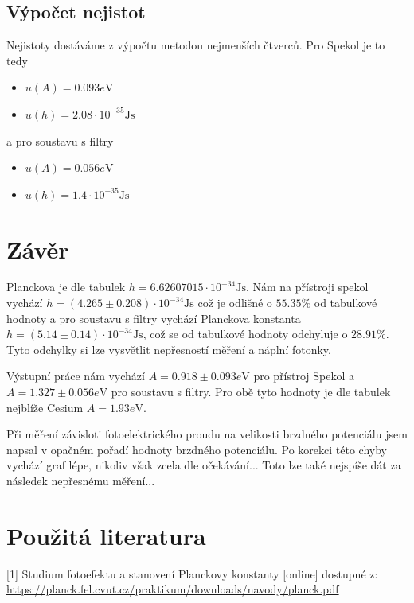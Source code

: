 \documentclass[titlepage]{article}
\begin{document}
\subsection{Výpočet nejistot}
Nejistoty dostáváme z výpočtu metodou nejmenších čtverců.
Pro Spekol je to tedy
\begin{itemize}
 \item $u(A) = 0.093 \si{e\volt}$
 \item $u(h) = 2.08 \cdot 10^{-35} \si{\joule\second}$
\end{itemize}
a pro soustavu s filtry
\begin{itemize}
 \item $u(A) = 0.056 \si{e\volt}$
 \item $u(h) = 1.4 \cdot 10^{-35} \si{\joule\second}$
\end{itemize}

\section{Závěr}

Planckova je dle tabulek $h=6.62607015 \cdot 10^{-34} \si{\joule\second}$. Nám na přístroji spekol vychází $h=(4.265\pm0.208) \cdot 10^{-34} \si{\joule\second}$ což je odlišné o $55.35\%$ od tabulkové hodnoty a pro soustavu s filtry vychází Planckova konstanta $h = (5.14\pm0.14)\cdot10^{-34}\si{\joule\second}$, což se od tabulkové hodnoty odchyluje o $28.91\%$. Tyto odchylky si lze vysvětlit nepřesností měření a náplní fotonky.

Výstupní práce nám vychází $A = 0.918\pm0.093 \si{e\volt}$ pro přístroj Spekol a $A = 1.327 \pm 0.056 \si{e\volt}$ pro soustavu s filtry. Pro obě tyto hodnoty je dle tabulek nejblíže Cesium $A = 1.93 \si{e\volt}$.

Při měření závisloti fotoelektrického proudu na velikosti brzdného potenciálu jsem napsal v opačném pořadí hodnoty brzdného potenciálu. Po korekci této chyby vychází graf lépe, nikoliv však zcela dle očekávání... Toto lze také nejspíše dát za následek nepřesnému měření...

\section{Použitá literatura}
[1] Studium fotoefektu a stanovení
Planckovy konstanty [online] dostupné z:
\url{https://planck.fel.cvut.cz/praktikum/downloads/navody/planck.pdf}
\end{document}

